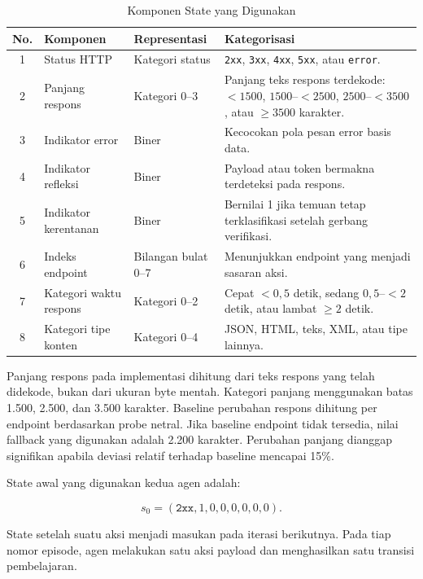 \begin{table}[H]
\centering
\caption{Komponen State yang Digunakan}
\label{tab:state_components}
\begin{tabular}{|c|p{3.2cm}|p{3.6cm}|p{5.3cm}|}
\hline
\textbf{No.} & \textbf{Komponen} & \textbf{Representasi} & \textbf{Kategorisasi} \\ \hline
1 & Status HTTP & Kategori status & \texttt{2xx}, \texttt{3xx}, \texttt{4xx}, \texttt{5xx}, atau \texttt{error}. \\ \hline
2 & Panjang respons & Kategori 0--3 & Panjang teks respons terdekode: \(<1500\), \(1500\)--\(<2500\), \(2500\)--\(<3500\), atau \(\geq 3500\) karakter. \\ \hline
3 & Indikator error & Biner & Kecocokan pola pesan error basis data. \\ \hline
4 & Indikator refleksi & Biner & Payload atau token bermakna terdeteksi pada respons. \\ \hline
5 & Indikator kerentanan & Biner & Bernilai 1 jika temuan tetap terklasifikasi setelah gerbang verifikasi. \\ \hline
6 & Indeks endpoint & Bilangan bulat 0--7 & Menunjukkan endpoint yang menjadi sasaran aksi. \\ \hline
7 & Kategori waktu respons & Kategori 0--2 & Cepat \(<0{,}5\) detik, sedang \(0{,}5\)--\(<2\) detik, atau lambat \(\geq 2\) detik. \\ \hline
8 & Kategori tipe konten & Kategori 0--4 & JSON, HTML, teks, XML, atau tipe lainnya. \\ \hline
\end{tabular}
\end{table}

Panjang respons pada implementasi dihitung dari teks respons yang telah didekode, bukan dari ukuran byte mentah. Kategori panjang menggunakan batas 1.500, 2.500, dan 3.500 karakter. Baseline perubahan respons dihitung per endpoint berdasarkan probe netral. Jika baseline endpoint tidak tersedia, nilai fallback yang digunakan adalah 2.200 karakter. Perubahan panjang dianggap signifikan apabila deviasi relatif terhadap baseline mencapai 15\%.

State awal yang digunakan kedua agen adalah:

\begin{equation}
s_0 = (\texttt{2xx}, 1, 0, 0, 0, 0, 0, 0).
\end{equation}

State setelah suatu aksi menjadi masukan pada iterasi berikutnya. Pada tiap nomor episode, agen melakukan satu aksi payload dan menghasilkan satu transisi pembelajaran.

